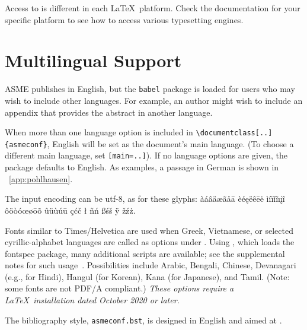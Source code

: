 \documentclass[captionpatch,colorlinks,upint,subscriptcorrection,varvw,mathalfa=cal=boondoxo,german]{asmeconf}
\begin{document}
Access to  is different in each \LaTeX\ platform.  Check the documentation for your specific platform to see how to access various typesetting engines.

\section{Multilingual Support}\label{appendix:c}

ASME publishes in English, but the \texttt{babel} package is loaded for 
users who may wish to include other languages. For example, an author might wish to include an appendix that provides the 
abstract in another language.

When more than one language option is included in \verb|\documentclass[..]{asmeconf}|, English will be 
set as the document's main language. (To choose a different main language, set \texttt{[main=..]}).
If no language options are given, the package defaults to English.  As examples, a passage in German is 
shown in  \appendixname~\ref{app:pohlhausen}.

The input encoding can be utf-8, as for these glyphs:
%
àáâäæãåā èéęëêēė ìíïǐĩıįî ôöòóœøōõ ûüùúū çćč ł ñń ßśš ÿ žźż.

Fonts similar to Times/Helvetica are used when Greek, Vietnamese, or selected cyrillic-alphabet languages are called as options under {\upshape{}}. Using {\upshape{}}, which loads the fontspec package, many additional scripts are available; see the supplemental notes for such usage~\cite{lienhard2021}. Possibilities include Arabic, Bengali, Chinese, Devanagari (e.g., for Hindi), Hangul (for Korean), Kana (for Japanese), and Tamil. (Note: some fonts are not PDF/A compliant.) \textit{These options require a \LaTeX\ installation dated October 2020 or later.}

The bibliography style, \texttt{asmeconf.bst}, is designed in English and aimed at .  

\end{document}
